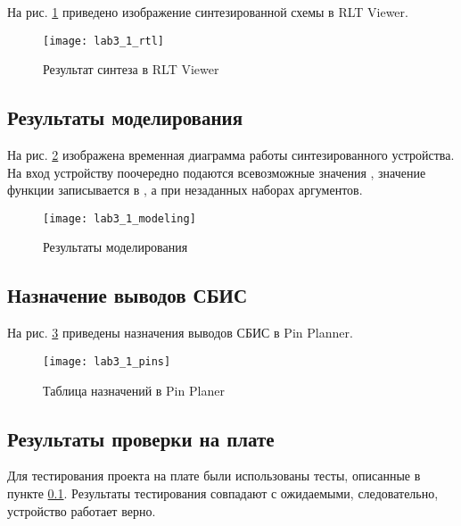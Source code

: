 На рис. \ref{fig:lab3_1_rtl} приведено изображение синтезированной схемы в RLT Viewer.

\begin{figure}[H]
\begin{center}
	\texttt{[image: lab3\_1\_rtl]}
	\caption{Результат синтеза в RLT Viewer}
	\label{fig:lab3_1_rtl}
\end{center}
\end{figure}

\subsection{Результаты моделирования}
\label{sec:lab3_1_modeling}

На рис. \ref{fig:lab3_1_modeling} изображена временная диаграмма работы синтезированного устройства. На вход устройству поочередно подаются всевозможные значения , значение функции записывается в , а  при незаданных наборах аргументов.
\begin{figure}[H]
\begin{center}
	\texttt{[image: lab3\_1\_modeling]}
	\caption{Результаты моделирования}
	\label{fig:lab3_1_modeling}
\end{center}
\end{figure}

\subsection{Назначение выводов СБИС}

На рис. \ref{fig:lab3_1_pins} приведены назначения выводов СБИС в Pin Planner.

\begin{figure}[H]
\begin{center}
	\texttt{[image: lab3\_1\_pins]}
	\caption{Таблица назначений в Pin Planer}
	\label{fig:lab3_1_pins}
\end{center}
\end{figure}

\subsection{Результаты проверки на плате}

Для тестирования проекта на плате были использованы тесты, описанные в пункте \ref{sec:lab3_1_modeling}. Результаты тестирования совпадают с ожидаемыми, следовательно, устройство работает верно.

